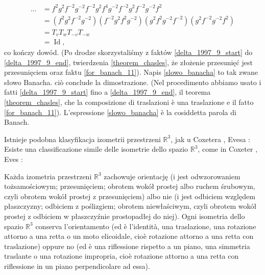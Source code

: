 \begin{align}
    \ldots & = f^2 g^2 f^{-2} g^{-2} f^{-2} g^2 f^4 g^{-2} f^{-2} g^2 f^{-2} g^{-2} f^2 \label{slowo_banacha} \\
    & = (f^2 g^2 f^{-2} g^{-2})( f^{-2} g^2 f^2 g^{-2}) (g^2 f^2g^{-2} f^{-2} ) (g^2 f^{-2} g^{-2} f^2) \\
    & = T_v T_w T_{-v} T_{-w} \\
    & = \operatorname{Id},
\end{align}
co kończy dowód. %
(Po drodze skorzystaliśmy z faktów \ref{delta_1997_9_start} do \ref{delta_1997_9_end}, twierdzenia \ref{theorem_chasles}, że złożenie przesunięć jest przesunięciem oraz faktu \ref{for_banach_11}). %
Napis \ref{slowo_banacha} to tak zwane słowo Banacha. %
ciò conclude la dimostrazione. %
(Nel procedimento abbiamo usato i fatti \ref{delta_1997_9_start} fino a \ref{delta_1997_9_end}, il teorema \ref{theorem_chasles}, che la composizione di traslazioni è una traslazione e il fatto \ref{for_banach_11}). %
L'espressione \ref{slowo_banacha} è la cosiddetta parola di Banach. %

Istnieje podobna klasyfikacja izometrii przestrzeni $\mathbb R^3$, jak u Coxetera \cite[s. 113-122]{coxeter_1967}, Evesa \cite[s. 148]{eves1_1972}: %
Esiste una classificazione simile delle isometrie dello spazio $\mathbb R^3$, come in Coxeter \cite[s. 113-122]{coxeter_1967}, Eves \cite[s. 148]{eves1_1972}: %

\begin{proposition}
    Każda izometria przestrzeni $\mathbb R^3$ %
    zachowuje orientację (i jest odwzorowaniem tożsamościowym; przesunięciem; obrotem wokół prostej albo ruchem śrubowym, czyli obrotem wokół prostej z przesunięciem) %
    albo nie (i jest odbiciem względem płaszczyzny; odbiciem z poślizgiem; obrotem niewłaściwym, czyli obrotem wokół prostej z odbiciem w płaszczyźnie prostopadłej do niej). %
    Ogni isometria dello spazio $\mathbb R^3$ %
    conserva l'orientamento (ed è l'identità, una traslazione, una rotazione attorno a una retta o un moto elicoidale, cioè rotazione attorno a una retta con traslazione) %
    oppure no (ed è una riflessione rispetto a un piano, una simmetria traslante o una rotazione impropria, cioè rotazione attorno a una retta con riflessione in un piano perpendicolare ad essa). %
\end{proposition}

